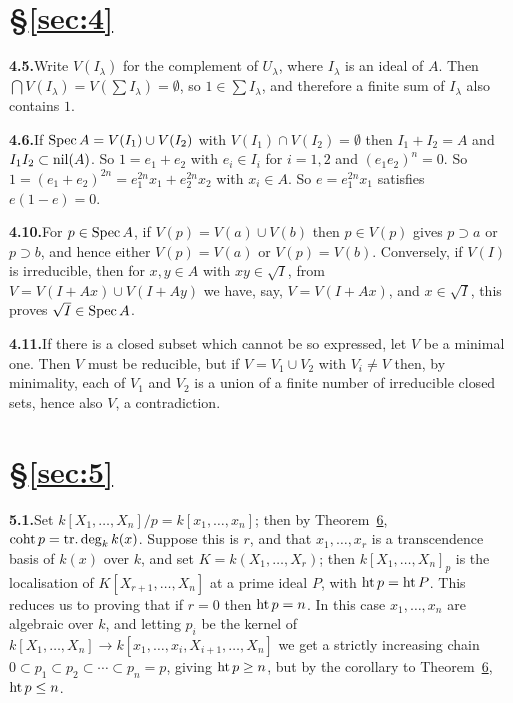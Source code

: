 
\section*{\S\ref{sec:4}}

\noindent\textbf{4.5.}\quad Write $V(I_\lambda)$ for the complement of $U_\lambda$, where $I_\lambda$ is an ideal of $A$. Then
$\bigcap V(I_\lambda) = V(\sum I_\lambda) = \emptyset$, so $1 \in \sum I_\lambda$, and therefore a finite sum of $I_\lambda$ also
contains $1$.

\noindent\textbf{4.6.}\quad If $\operatorname{Spec} A = V(I_1) \cup V(I_2)$ with $V(I_1) \cap V(I_2) = \emptyset$ then $I_1 + I_2 = A$ and
$I_1I_2 \subset \operatorname{nil}(A)$. So $1 = e_1 + e_2$ with $e_i \in I_i$ for $i = 1, 2$ and $(e_1e_2)^n = 0$. So $1 =
(e_1 + e_2)^{2n} = e_1^{2n}x_1 + e_2^{2n}x_2$ with $x_i \in A$. So $e = e_1^{2n}x_1$ satisfies $e(1 - e) = 0$.

\noindent\textbf{4.10.}\quad For $p \in \operatorname{Spec} A$, if $V(p) = V(a) \cup V(b)$ then $p \in V(p)$ gives $p \supset a$ or $p \supset b$, and
hence either $V(p) = V(a)$ or $V(p) = V(b)$. Conversely, if $V(I)$ is irreducible,
then for $x, y \in A$ with $xy \in \sqrt{I}$, from $V = V(I + Ax) \cup V(I + Ay)$ we have,
say, $V = V(I + Ax)$, and $x \in \sqrt{I}$, this proves $\sqrt{I} \in \operatorname{Spec} A$.

\noindent\textbf{4.11.}\quad If there is a closed subset which cannot be so expressed, let $V$ be a minimal
one. Then $V$ must be reducible, but if $V = V_1 \cup V_2$ with $V_i \neq V$ then, by
minimality, each of $V_1$ and $V_2$ is a union of a finite number of irreducible
closed sets, hence also $V$, a contradiction.

\section*{\S\ref{sec:5}}

\noindent\textbf{5.1.}\quad Set $k[X_1, \ldots, X_n]/p = k[x_1, \ldots, x_n]$; then by Theorem~\hyperref[thm:5.6]{6}, $\operatorname{coht} p =
\operatorname{tr.deg}_k k(x)$. Suppose this is $r$, and that $x_1, \ldots, x_r$ is a transcendence basis
of $k(x)$ over $k$, and set $K = k(X_1, \ldots, X_r)$; then $k[X_1, \ldots, X_n]_p$ is the
localisation of $K[X_{r+1}, \ldots, X_n]$ at a prime ideal $P$, with $\operatorname{ht} p = \operatorname{ht} P$. This
reduces us to proving that if $r = 0$ then $\operatorname{ht} p = n$. In this case $x_1, \ldots, x_n$ are
algebraic over $k$, and letting $p_i$ be the kernel of $k[X_1, \ldots, X_n] \to
k[x_1, \ldots, x_i, X_{i+1}, \ldots, X_n]$ we get a strictly increasing chain $0 \subset p_1 \subset p_2
\subset \cdots \subset p_n = p$, giving $\operatorname{ht} p \ge n$, but by the corollary to Theorem~\hyperref[thm:5.6]{6},
$\operatorname{ht} p \le n$.


